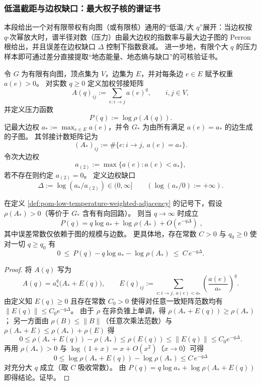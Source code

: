 \subsubsection{低温截距与边权缺口：最大权子核的谱证书}\label{subsubsec:pom-low-temperature-maxedge-gap}
本段给出一个对有限带权有向图（或有限核）通用的“低温/大 \(q\)”展开：当边权按 \(q\)-次幂放大时，谱半径对数（压力）由最大边权的指数率与最大边子图的 Perron 根给出，并且误差在边权缺口 \(\Delta\) 控制下指数衰减。
进一步地，有限个大 \(q\) 的压力样本即可通过差分直接提取“地态能量、地态熵与缺口”的可核验证书。

\begin{definition}[低温矩核与压力]\label{def:pom-low-temperature-weighted-adjacency}
令 \(G\) 为有限有向图，顶点集为 \(V\)，边集为 \(E\)，并对每条边 \(e\in E\) 赋予权重 \(a(e)>0\)。
对实数 \(q\ge 0\) 定义加权邻接矩阵
\[
A(q)_{ij}:=\sum_{e:i\to j} a(e)^{q},
\qquad i,j\in V,
\]
并定义压力函数
\[
P(q):=\log\rho(A(q)).
\]
记最大边权 \(a_*:=\max_{e\in E}a(e)\)，并令 \(G_*\) 为由所有满足 \(a(e)=a_*\) 的边生成的子图。
其邻接计数矩阵记为
\[
(A_*)_{ij}:=\#\{e:i\to j,\ a(e)=a_*\}.
\]
令次大边权
\[
a_{(2)}:=\max\{a(e):a(e)<a_*\},
\]
若不存在则约定 \(a_{(2)}=0\)。
定义边权缺口
\[
\Delta:=\log(a_*/a_{(2)})\in(0,\infty]\qquad(\log(a_*/0):=+\infty).
\]
\end{definition}

\begin{theorem}[低温三项展开与指数误差]\label{thm:pom-low-temperature-three-term-expansion}
在定义 \ref{def:pom-low-temperature-weighted-adjacency} 的记号下，假设 \(\rho(A_*)>0\)（等价于 \(G_*\) 含有有向回路）。
则当 \(q\to\infty\) 时成立
\[
\boxed{\;
P(q)=q\log a_*+\log\rho(A_*)+O(e^{-q\Delta})\; },
\]
其中误差常数仅依赖于图的规模与边数。
更具体地，存在常数 \(C>0\) 与 \(q_0\ge 0\) 使对一切 \(q\ge q_0\) 有
\[
0\ \le\ P(q)-q\log a_*-\log\rho(A_*)\ \le\ C\,e^{-q\Delta}.
\]
\end{theorem}
\begin{proof}
将 \(A(q)\) 写为
\[
A(q)=a_*^{q}\bigl(A_*+E(q)\bigr),
\qquad
E(q)_{ij}:=\sum_{e:i\to j,\ a(e)<a_*}\left(\frac{a(e)}{a_*}\right)^q.
\]
由定义知 \(E(q)\ge 0\) 且存在常数 \(C_0>0\) 使得对任意一致矩阵范数均有 \(\|E(q)\|\le C_0 e^{-q\Delta}\)。
由于 \(\rho\) 在非负锥上单调，得 \(\rho(A_*+E(q))\ge \rho(A_*)\)；
另一方面由 \(\rho(B)\le \|B\|\)（任意次乘法范数）与 \(\rho(A_*+E)\le \rho(A_*)+\rho(E)\) 得
\[
0\le \rho(A_*+E(q))-\rho(A_*)\le \rho(E(q))\le \|E(q)\|\le C_0 e^{-q\Delta}.
\]
再用 \(\rho(A_*)>0\) 与 \(\log(1+x)=x+O(x^2)\)（\(x\to 0\)）可得
\[
0\le \log\rho(A_*+E(q))-\log\rho(A_*)\le C\,e^{-q\Delta}
\]
对充分大 \(q\) 成立（取 \(C\) 吸收常数）。
由
\(
P(q)=q\log a_*+\log\rho(A_*+E(q))
\)
即得结论。证毕。
\end{proof}

